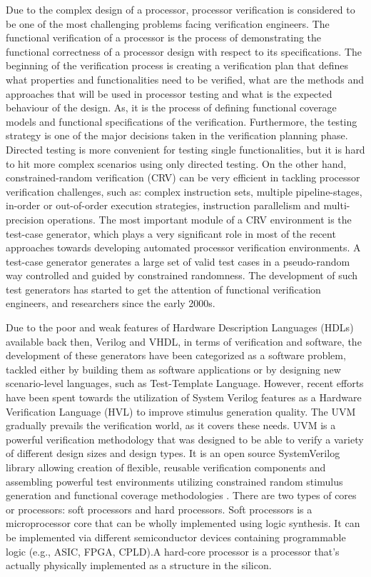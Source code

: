 \documentclass[conference,10 pt,twoside]{IEEEtran}
\begin{document}
 
      Due to the complex design of a processor, processor verification is considered to be one of the most challenging problems facing verification engineers. The functional verification of a processor is the process of demonstrating the functional correctness of a processor design with respect to its specifications. The beginning of the verification process is creating a verification plan that defines what properties and functionalities need to be verified, what are the methods and approaches that will be used in processor testing and what is the expected behaviour of the design. As, it is the process of defining functional coverage models and functional specifications of the verification. Furthermore, the testing strategy is one of the major decisions taken in the verification planning phase. Directed testing is more convenient for testing single functionalities, but it is hard to hit more complex scenarios using only directed testing. On the other hand, constrained-random verification (CRV) can be very efficient in tackling processor verification challenges, such as: complex instruction sets, multiple pipeline-stages, in-order or out-of-order execution strategies, instruction parallelism and multi-precision operations. The most important module of a CRV environment is the test-case generator, which plays a very significant role in most of the recent approaches towards developing automated processor verification environments. A test-case generator generates a large set of valid test cases in a pseudo-random way controlled and guided by constrained randomness. The development of such test generators has started to get the attention of functional verification engineers, and researchers since the early 2000s.       
 
           
     Due to the poor and weak features of Hardware Description Languages (HDLs) available back then, Verilog and VHDL, in terms of verification and software, the development of these generators have been categorized as a software problem, tackled either by building them as software applications or by designing new scenario-level languages, such as Test-Template Language. However, recent efforts have been spent towards the utilization of System Verilog features as a Hardware Verification Language (HVL) to improve stimulus generation quality. The UVM gradually prevails the verification world, as it covers these needs. UVM is a powerful verification methodology that was designed to be able to verify a variety of different design sizes and design types. It is an open source SystemVerilog library allowing creation of flexible, reusable verification components and assembling powerful test environments utilizing constrained random stimulus generation and functional coverage methodologies \cite{b3}.
There are two types of cores or processors: soft processors and hard processors. Soft processors is a microprocessor core that can be wholly implemented using logic synthesis. It can be implemented via different semiconductor devices containing programmable logic (e.g., ASIC, FPGA, CPLD).A hard-core processor is a processor that's actually physically implemented as a structure in the silicon. 
      
\end{document}
